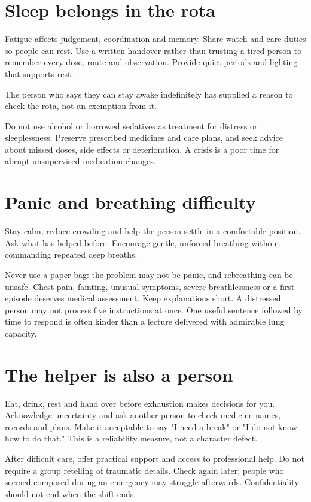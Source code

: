 \documentclass[10pt,openright]{book}
\begin{document}
\section*{Sleep belongs in the rota}
Fatigue affects judgement, coordination and memory. Share watch and care duties so people can rest. Use a written handover rather than trusting a tired person to remember every dose, route and observation. Provide quiet periods and lighting that supports rest.

The person who says they can stay awake indefinitely has supplied a reason to check the rota, not an exemption from it.

Do not use alcohol or borrowed sedatives as treatment for distress or sleeplessness. Preserve prescribed medicines and care plans, and seek advice about missed doses, side effects or deterioration. A crisis is a poor time for abrupt unsupervised medication changes.

\section*{Panic and breathing difficulty}
Stay calm, reduce crowding and help the person settle in a comfortable position. Ask what has helped before. Encourage gentle, unforced breathing without commanding repeated deep breaths.

Never use a paper bag: the problem may not be panic, and rebreathing can be unsafe. Chest pain, fainting, unusual symptoms, severe breathlessness or a first episode deserves medical assessment. Keep explanations short. A distressed person may not process five instructions at once. One useful sentence followed by time to respond is often kinder than a lecture delivered with admirable lung capacity.

\section*{The helper is also a person}
Eat, drink, rest and hand over before exhaustion makes decisions for you. Acknowledge uncertainty and ask another person to check medicine names, records and plans. Make it acceptable to say "I need a break" or "I do not know how to do that." This is a reliability measure, not a character defect.

After difficult care, offer practical support and access to professional help. Do not require a group retelling of traumatic details. Check again later; people who seemed composed during an emergency may struggle afterwards. Confidentiality should not end when the shift ends.
\end{document}
